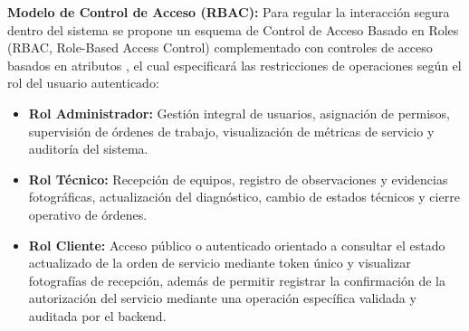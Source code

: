 \textbf{Modelo de Control de Acceso (RBAC):} Para regular la interacción segura dentro del sistema se propone un esquema de Control de Acceso Basado en Roles (RBAC, Role-Based Access Control) complementado con controles de acceso basados en atributos \cite{ferraiolo1992, nist2014}, el cual especificará las restricciones de operaciones según el rol del usuario autenticado:

\begin{itemize}
    \item \textbf{Rol Administrador:} Gestión integral de usuarios, asignación de permisos, supervisión de órdenes de trabajo, visualización de métricas de servicio y auditoría del sistema.
    \item \textbf{Rol Técnico:} Recepción de equipos, registro de observaciones y evidencias fotográficas, actualización del diagnóstico, cambio de estados técnicos y cierre operativo de órdenes.
    \item \textbf{Rol Cliente:} Acceso público o autenticado orientado a consultar el estado actualizado de la orden de servicio mediante token único y visualizar fotografías de recepción, además de permitir registrar la confirmación de la autorización del servicio mediante una operación específica validada y auditada por el backend.
\end{itemize}